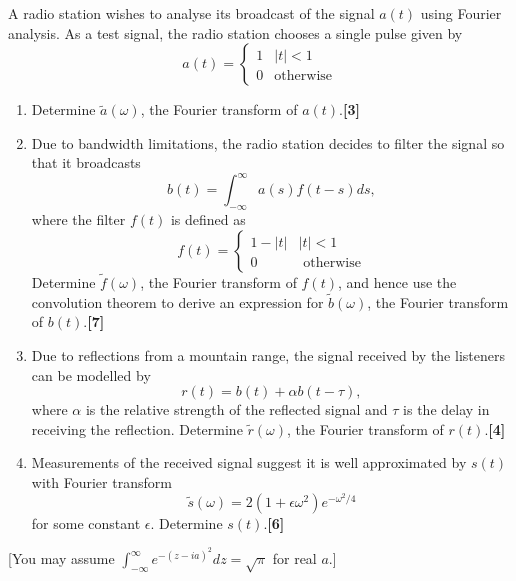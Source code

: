 \documentclass[a4paper]{article}
\begin{document}
\begin{qns}
A radio station wishes to analyse its broadcast of the signal $a(t)$ using Fourier analysis. As a test signal, the radio station chooses a single pulse given by
$$a(t)=
\left\{
        \begin{array}{ll}
      1 & |t|<1 \\
      0 & \text{otherwise}
        \end{array}
    \right.$$
\begin{enumerate}[label=(\alph*)]
\item Determine $\tilde{a}(\omega)$, the Fourier transform of $a(t)$.\hfill \textbf{[3]}
\item Due to bandwidth limitations, the radio station decides to filter the signal so that it broadcasts
$$b(t)=\int_{-\infty}^\infty a(s)f(t-s)ds,$$
where the filter $f(t)$ is defined as
$$f(t)=
\left\{
        \begin{array}{ll}
      1-|t| & |t|<1 \\
      0 & \text{ otherwise}
        \end{array}
    \right.$$
Determine $\tilde{f}(\omega)$, the Fourier transform of $f(t)$, and hence use the convolution theorem to derive an expression for $\tilde{b}(\omega)$, the Fourier transform of $b(t)$.\hfill \textbf{[7]}
\item Due to reflections from a mountain range, the signal received by the listeners can be modelled by
$$r(t)=b(t)+\alpha b(t-\tau),$$
where $\alpha$ is the relative strength of the reflected signal and $\tau$ is the delay in receiving the reflection. Determine $\tilde{r}(\omega)$, the Fourier transform of $r(t)$.\hfill \textbf{[4]}
\item Measurements of the received signal suggest it is well approximated by $s(t)$ with Fourier transform
$$\tilde{s}(\omega)=2(1+\epsilon\omega^2)e^{-\omega^2/4}$$
for some constant $\epsilon$. Determine $s(t)$.\hfill \textbf{[6]}
\end{enumerate}
[You may assume $\int_{-\infty}^\infty e^{-(z-ia)^2}dz=\sqrt{\pi}$ for real $a$.]
\end{qns}
\end{document}
